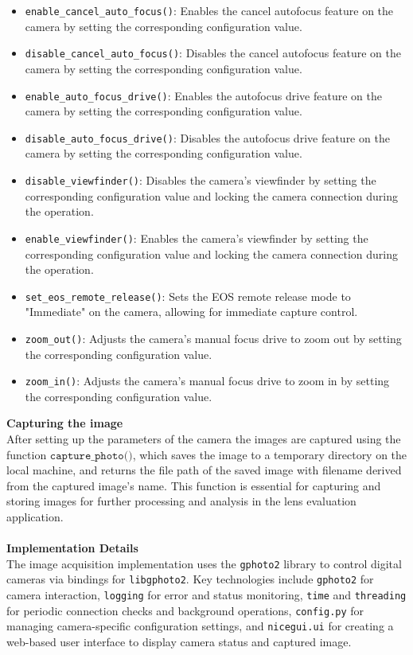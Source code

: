 \begin{itemize}
    \item \texttt{enable\_cancel\_auto\_focus()}: Enables the cancel autofocus feature on the camera by setting the corresponding configuration value.
    \item \texttt{disable\_cancel\_auto\_focus()}: Disables the cancel autofocus feature on the camera by setting the corresponding configuration value.
    \item \texttt{enable\_auto\_focus\_drive()}: Enables the autofocus drive feature on the camera by setting the corresponding configuration value.
    \item \texttt{disable\_auto\_focus\_drive()}: Disables the autofocus drive feature on the camera by setting the corresponding configuration value.
    \item \texttt{disable\_viewfinder()}: Disables the camera's viewfinder by setting the corresponding configuration value and locking the camera connection during the operation.
    \item \texttt{enable\_viewfinder()}: Enables the camera's viewfinder by setting the corresponding configuration value and locking the camera connection during the operation.
    \item \texttt{set\_eos\_remote\_release()}: Sets the EOS remote release mode to "Immediate" on the camera, allowing for immediate capture control.
    \item \texttt{zoom\_out()}: Adjusts the camera's manual focus drive to zoom out by setting the corresponding configuration value.
    \item \texttt{zoom\_in()}: Adjusts the camera's manual focus drive to zoom in by setting the corresponding configuration value.
\end{itemize}
\textbf{Capturing the image}
\\
After setting up the parameters of the camera the images are captured using the function $\texttt{capture\_photo()}$, which saves the image to a temporary directory on the local machine, and returns the file path of the saved image with filename derived from the captured image's name. This function is essential for capturing and storing images for further processing and analysis in the lens evaluation application.
\\
\\
\textbf{Implementation Details}
\\
The image acquisition implementation uses the \texttt{gphoto2} library to control digital cameras via bindings for \texttt{libgphoto2}. Key technologies include \texttt{gphoto2} for camera interaction, \texttt{logging} for error and status monitoring, \texttt{time} and \texttt{threading} for periodic connection checks and background operations, \texttt{config.py} for managing camera-specific configuration settings, and \texttt{nicegui.ui} for creating a web-based user interface to display camera status and captured image.

